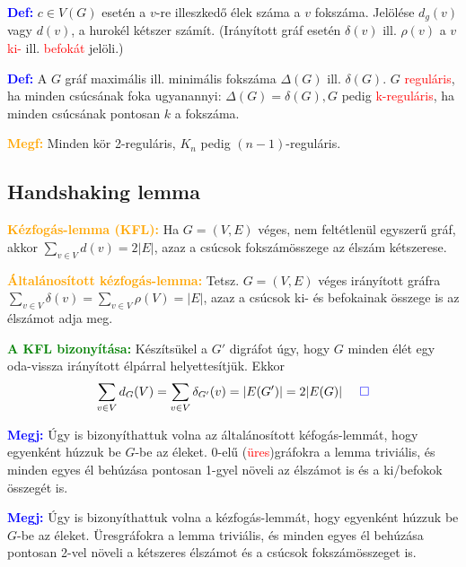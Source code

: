 \documentclass[../szamtud.tex]{subfiles}
\begin{document}
        \textcolor{blue}{\textbf{Def:}} $c \in V(G)$ esetén a $v$-re illeszkedő élek száma a $v$ fokszáma. Jelölése $d_g(v)$ vagy $d(v)$, a hurokél kétszer számít. (Irányított gráf esetén $\delta(v)$ ill. $\rho(v)$ a $v$ \textcolor{red}{ki-} ill. \textcolor{red}{befokát} jelöli.)

        \textcolor{blue}{\textbf{Def:}} A $G$ gráf maximális ill. minimális fokszáma $\Delta(G)$ ill. $\delta(G)$. $G$ \textcolor{red}{reguláris}, ha minden csúcsának foka ugyanannyi: $\Delta(G)=\delta(G),G$ pedig \textcolor{red}{k-reguláris}, ha minden csúcsának pontosan $k$ a fokszáma.

        \textcolor{orange}{\textbf{Megf:}} Minden kör 2-reguláris, $K_n$ pedig $(n-1)$-reguláris.

    \subsection{Handshaking lemma}

        \textcolor{orange}{\textbf{Kézfogás-lemma (KFL):}} Ha $G = (V,E)$ véges, nem feltétlenül egyszerű gráf, akkor $\sum_{v \in V} d(v)=2|E|$, azaz a csúcsok fokszámösszege az élszám kétszerese.
    
        \textcolor{orange}{\textbf{Általánosított kézfogás-lemma:}} Tetsz. $G = (V,E)$ véges irányított gráfra $\sum_{v \in V} \delta (v) = \sum_{v \in V} \rho (V) = |E|$, azaz a csúcsok ki- és befokainak összege is az élszámot adja meg. 

        
        \textcolor{green}{\textbf{A KFL bizonyítása:}} Készítsükel a $G'$ digráfot úgy, hogy $G$ minden élét egy oda-vissza irányított élpárral helyettesítjük. Ekkor \[\sum_{v \in V} d_G(V) = \sum_{v \in V} \delta_{G'} (v) = |E(G')| = 2|E(G)| \;\;\;\;\;\textcolor{blue}{\Box} \]

        \textcolor{blue}{\textbf{Megj:}} Úgy is bizonyíthattuk volna az általánosított kéfogás-lemmát, hogy egyenként húzzuk be $G$-be az éleket. 0-elű (\textcolor{red}{üres})gráfokra a lemma triviális, és minden egyes él behúzása pontosan 1-gyel növeli az élszámot is és a ki/befokok összegét is.

        \textcolor{blue}{\textbf{Megj:}} Úgy is bizonyíthattuk volna a kézfogás-lemmát, hogy egyenként húzzuk be $G$-be az éleket. Üresgráfokra a lemma triviális, és minden egyes él behúzása pontosan 2-vel növeli a kétszeres élszámot és a csúcsok fokszámösszeget is.
\end{document}
